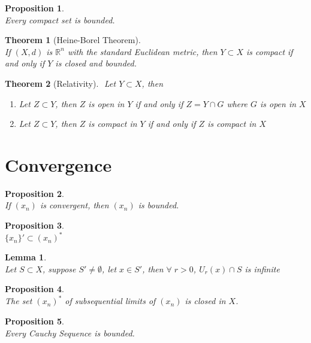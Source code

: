 \documentclass[10pt,a4paper]{article}
\newtheorem{theorem}{Theorem}
\newtheorem{lemma}{Lemma}
\newtheorem{proposition}{Proposition}
\theoremstyle{definition}
\theoremstyle{definition}
\numberwithin{equation}{section}
\numberwithin{theorem}{section}
\numberwithin{proposition}{section}
\numberwithin{lemma}{section}
\numberwithin{corollary}{section}
\begin{document}
\begin{proposition}$ $
\\Every compact set is bounded. 
\end{proposition}

\begin{theorem}[Heine-Borel Theorem]$ $
\\If $(X, d)$ is $\mathbb{R}^n$ with the standard Euclidean metric, then $Y \subset X$ is compact if and only if $Y$ is closed and bounded. 
\end{theorem}

\begin{theorem}[Relativity]$ $
Let $Y \subset X$, then
\begin{enumerate}
\item Let $Z \subset Y$, then $Z$ is open in $Y$ if and only if $Z = Y \cap G$ where $G$ is open in $X$
\item Let $Z \subset Y$, then $Z$ is compact in $Y$ if and only if $Z$ is compact in $X$
\end{enumerate}
\end{theorem}


\newpage
\section{Convergence}

\begin{proposition}$ $
\\If $(x_n)$ is convergent, then $(x_n)$ is bounded. 
\end{proposition}

\begin{proposition}$ $
\\$\{x_n\}' \subset (x_n)^*$
\end{proposition}

\begin{lemma}$ $
\\Let $S \subset X$, suppose $S' \neq \emptyset$, let $x \in S'$, then $\forall \; r > 0$, $U_r(x) \cap S$ is infinite
\end{lemma}

\begin{proposition}$ $
\\The set $(x_n)^*$ of subsequential limits of $(x_n)$ is closed in $X$. 
\end{proposition}

\begin{proposition}$ $
\\Every Cauchy Sequence is bounded. 
\end{proposition}
\end{document}
